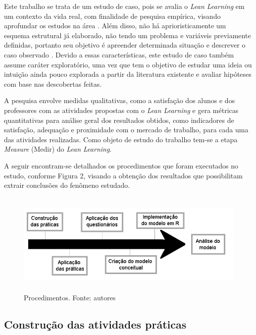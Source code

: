Este trabalho se trata de um estudo de caso, pois se avalia o \textit{Lean Learning} em um contexto da vida real, com finalidade de pesquisa empírica, visando aprofundar os estudos na área \cite{MIGUEL2007}. Além disso, não há aprioristicamente um esquema estrutural já elaborado, não tendo um problema e variáveis previamente definidas, portanto seu objetivo é apreender determinada situação e descrever o caso observado \cite{marconi2003fundamentos} \cite{marconi2012tecnicas}. Devido a essas características, este estudo de caso também assume caráter exploratório, uma vez que tem o objetivo de estudar uma ideia ou intuição ainda pouco explorada \cite{de2011metodologia} a partir da literatura existente e avaliar hipóteses com base nas descobertas feitas.

A pesquisa envolve medidas qualitativas, como a satisfação dos alunos e dos professores com as atividades propostas com o \textit{Lean Learning} e gera métricas quantitativas \cite{Metricas} para análise geral dos resultados obtidos, como indicadores de satisfação, adequação e proximidade com o mercado de trabalho, para cada uma das atividades realizadas. Como objeto de estudo do trabalho tem-se a etapa \textit{Measure} (Medir) do \textit{Lean Learning}.

A seguir encontram-se detalhados os procedimentos que foram executados no estudo, conforme Figura 2, visando a obtenção dos resultados que possibilitam extrair conclusões do fenômeno estudado.

\begin{figure}[!ht]
    \centering
    \includegraphics[width=15cm,height=5cm]{Imagens/Procedimento.png}
    \caption{Procedimentos. Fonte: autores}
    \label{fig:Procedimento}
\end{figure}

\subsection{Construção das atividades práticas}

